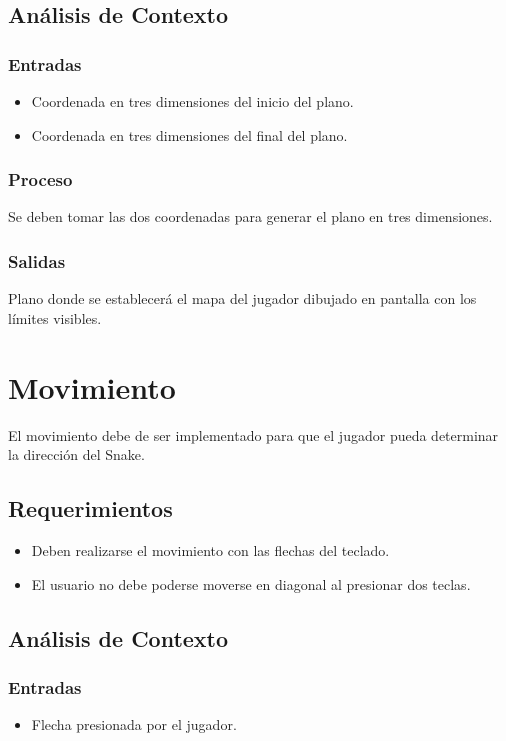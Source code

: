 \documentclass[letterpaper]{scrreprt}
\begin{document}
\subsection{Análisis de Contexto}
\subsubsection{Entradas}
\begin{itemize}
	\item Coordenada en tres dimensiones del inicio del plano. 
	\item Coordenada en tres dimensiones del final del plano.
\end{itemize}
\subsubsection{Proceso}
Se deben tomar las dos coordenadas para generar el plano en tres dimensiones.
\subsubsection{Salidas}
Plano donde se establecerá el mapa del jugador dibujado en pantalla con los límites visibles.


\section{Movimiento}
El movimiento debe de ser implementado para que el jugador pueda determinar la dirección del Snake. 

\subsection{Requerimientos}
\begin{itemize}
	\item Deben realizarse el movimiento con las flechas del teclado.
	\item El usuario no debe poderse moverse en diagonal al presionar dos teclas.
\end{itemize}

\subsection{Análisis de Contexto}
\subsubsection{Entradas}
\begin{itemize}
	\item Flecha presionada por el jugador.
\end{itemize}
\end{document}
